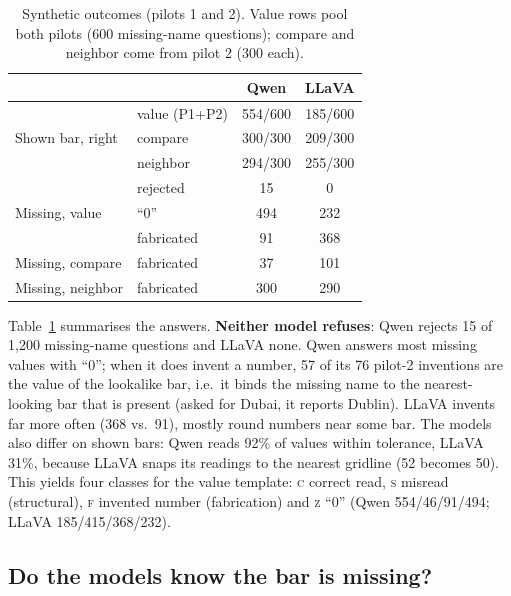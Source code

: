 \documentclass[11pt]{article}
\newcommand{\cls}[1]{\textsc{#1}}
\begin{document}
\begin{table}[t]
\centering\small
\setlength{\tabcolsep}{4pt}
\begin{tabular}{llcc}
\toprule
 & & Qwen & LLaVA \\
\midrule
\multirow{3}{*}{Shown bar, right} & value (P1+P2) & 554/600 & 185/600 \\
 & compare & 300/300 & 209/300 \\
 & neighbor & 294/300 & 255/300 \\
\midrule
\multirow{3}{*}{Missing, value} & rejected & 15 & 0 \\
 & ``0'' & 494 & 232 \\
 & fabricated & 91 & 368 \\
\midrule
Missing, compare & fabricated & 37 & 101 \\
Missing, neighbor & fabricated & 300 & 290 \\
\bottomrule
\end{tabular}
\caption{Synthetic outcomes (pilots 1 and 2). Value rows pool both pilots (600
missing-name questions); compare and neighbor come from pilot 2 (300 each).}
\label{tab:synth}
\end{table}

Table~\ref{tab:synth} summarises the answers. \textbf{Neither model refuses}:
Qwen rejects 15 of 1,200 missing-name questions and LLaVA none. Qwen answers
most missing values with ``0''; when it does invent a number, 57 of its 76
pilot-2 inventions are the value of the lookalike bar, i.e.\ it binds the
missing name to the nearest-looking bar that is present (asked for Dubai, it
reports Dublin). LLaVA invents far more often (368 vs.\ 91), mostly round
numbers near some bar. The models also differ on shown bars: Qwen reads 92\% of
values within tolerance, LLaVA 31\%, because LLaVA snaps its readings to the
nearest gridline (52 becomes 50). This yields four classes for the value
template: \cls{c} correct read, \cls{s} misread (structural), \cls{f} invented
number (fabrication) and \cls{z} ``0'' (Qwen 554/46/91/494; LLaVA
185/415/368/232).

\subsection{Do the models know the bar is missing?}
\end{document}
